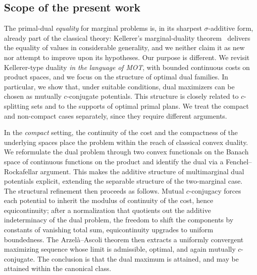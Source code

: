\documentclass[twoside,11pt,a4paper]{article}
\begin{document}
\subsection{Scope of the present work}
The primal-dual \emph{equality} for marginal problems is, in its sharpest
$\sigma$-additive form, already part of the classical theory: Kellerer's
marginal-duality theorem~\cite{kellerer} delivers the equality of values in
considerable generality, and we neither claim it as new nor attempt to improve
upon its hypotheses. Our purpose is different. We
revisit Kellerer-type duality \emph{in the language of MOT}, with bounded continuous costs on product spaces, and we focus on the structure of optimal dual families. In particular, we show that, under suitable conditions, dual maximizers can be chosen as mutually $c$-conjugate potentials. This structure is closely related to $c$-splitting sets and to the supports of optimal primal plans. We treat the compact and non-compact cases separately, since they require different arguments.

In the \emph{compact} setting, the continuity of the cost and the compactness of
the underlying spaces place the problem within the reach of classical convex
duality. We reformulate the dual problem through two convex functionals on the
Banach space of continuous functions on the product and identify the dual via a
Fenchel--Rockafellar argument. This makes the additive structure of multimarginal dual potentials explicit, extending the separable structure of the two-marginal case. The structural refinement then proceeds as
follows. Mutual $c$-conjugacy forces each potential to inherit the modulus of
continuity of the cost, hence equicontinuity; after a normalization that quotients
out the additive indeterminacy of the dual problem, the freedom to shift the
components by constants of vanishing total sum, equicontinuity upgrades to
uniform boundedness. The Arzelà--Ascoli theorem then extracts a uniformly
convergent maximizing sequence whose limit is admissible, optimal, and again
mutually $c$-conjugate. The conclusion is that the dual maximum is attained, and
may be attained within the canonical class.
\end{document}
